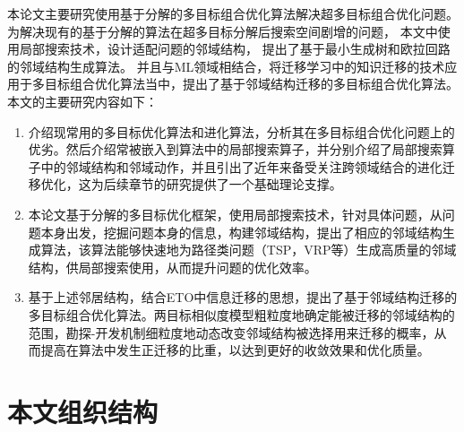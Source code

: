 本论文主要研究使用基于分解的多目标组合优化算法解决超多目标组合优化问题。
为解决现有的基于分解的算法在超多目标分解后搜索空间剧增的问题，
本文中使用局部搜索技术，设计适配问题的邻域结构，
提出了基于最小生成树和欧拉回路的邻域结构生成算法。
并且与ML领域相结合，将迁移学习中的知识迁移的技术应用于多目标组合优化算法当中，提出了基于邻域结构迁移的多目标组合优化算法。本文的主要研究内容如下：
\begin{enumerate}
    \item 介绍现常用的多目标优化算法和进化算法，分析其在多目标组合优化问题上的优劣。然后介绍常被嵌入到算法中的局部搜索算子，并分别介绍了局部搜索算子中的邻域结构和邻域动作，并且引出了近年来备受关注跨领域结合的进化迁移优化，这为后续章节的研究提供了一个基础理论支撑。
    \item 本论文基于分解的多目标优化框架，使用局部搜索技术，针对具体问题，从问题本身出发，挖掘问题本身的信息，构建邻域结构，提出了相应的邻域结构生成算法，该算法能够快速地为路径类问题（TSP，VRP等）生成高质量的邻域结构，供局部搜索使用，从而提升问题的优化效率。
    \item 基于上述邻居结构，结合ETO中信息迁移的思想，提出了基于邻域结构迁移的多目标组合优化算法。两目标相似度模型粗粒度地确定能被迁移的邻域结构的范围，勘探-开发机制细粒度地动态改变邻域结构被选择用来迁移的概率，从而提高在算法中发生正迁移的比重，以达到更好的收敛效果和优化质量。
\end{enumerate}

\section{本文组织结构}

